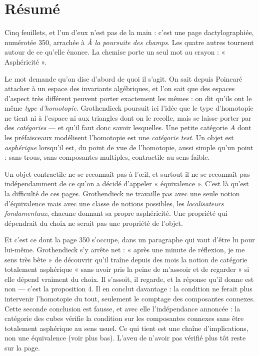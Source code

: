 \documentclass[11pt,a4paper]{article}
\begin{document}
\section*{Résumé}

\begin{resume}
Cinq feuillets, et l'un d'eux n'est pas de la main : c'est une page
dactylographiée, numérotée 350, arrachée à \emph{À la poursuite des champs}. Les
quatre autres tournent autour de ce qu'elle énonce. La chemise porte un seul
mot au crayon : « Asphéricité ».

Le mot demande qu'on dise d'abord de quoi il s'agit. On sait depuis Poincaré
attacher à un espace des invariants algébriques, et l'on sait que des espaces
d'aspect très différent peuvent porter exactement les mêmes : on dit qu'ils ont
le même \emph{type d'homotopie}. Grothendieck poursuit ici l'idée que le type
d'homotopie ne tient ni à l'espace ni aux triangles dont on le recolle, mais se
laisse porter par des \emph{catégories} — et qu'il faut donc savoir lesquelles.
Une petite catégorie $A$ dont les préfaisceaux modélisent l'homotopie est une
\emph{catégorie test}. Un objet est \emph{asphérique} lorsqu'il est, du point de
vue de l'homotopie, aussi simple qu'un point : sans trous, sans composantes
multiples, contractile au sens faible.

Un objet contractile ne se reconnaît pas à l'œil, et surtout il ne se reconnaît
pas indépendamment de ce qu'on a décidé d'appeler « équivalence ». C'est là
qu'est la difficulté de ces pages. Grothendieck ne travaille pas avec une seule
notion d'équivalence mais avec une classe de notions possibles, les
\emph{localisateurs fondamentaux}, chacune donnant sa propre asphéricité. Une
propriété qui dépendrait du choix ne serait pas une propriété de l'objet.

Et c'est ce dont la page 350 s'occupe, dans un paragraphe qui vaut d'être lu
pour lui-même. Grothendieck s'y arrête net : « après une minute de réflexion, je
me sens très bête » de découvrir qu'il traîne depuis des mois la notion de
catégorie totalement asphérique « sans avoir pris la peine de m'asseoir et de
regarder » si elle dépend vraiment du choix. Il s'assoit, il regarde, et la
réponse qu'il donne est non — c'est la proposition 4. Il en conclut davantage :
la condition ne ferait plus intervenir l'homotopie du tout, seulement le comptage
des composantes connexes. Cette seconde conclusion est fausse, et avec elle
l'indépendance annoncée : la catégorie des cubes vérifie la condition sur les
composantes connexes sans être totalement asphérique au sens usuel. Ce qui
tient est une chaîne d'implications, non une équivalence (voir plus bas).
L'aveu de n'avoir pas vérifié plus tôt reste sur la page.


\end{resume}
\end{document}
